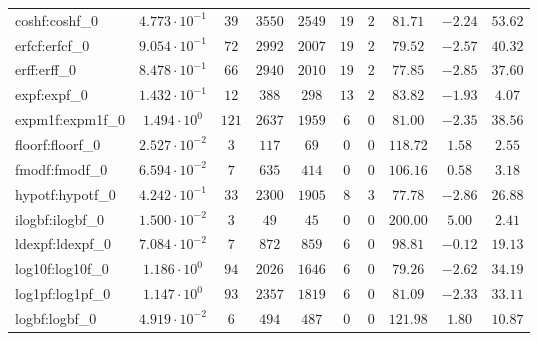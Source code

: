 \begin{tabular}{|l|c|c|c|c|c|c|c|c|c|}
coshf:coshf\_0               & $ 4.773 \cdot 10^{-1} $ & $ 39     $ & $ 3550  $ & $ 2549  $ & $ 19  $ & $ 2  $ & $ 81.71       $ & $ -2.24   $ & $ 53.62   $ \\
erfcf:erfcf\_0               & $ 9.054 \cdot 10^{-1} $ & $ 72     $ & $ 2992  $ & $ 2007  $ & $ 19  $ & $ 2  $ & $ 79.52       $ & $ -2.57   $ & $ 40.32   $ \\
erff:erff\_0                 & $ 8.478 \cdot 10^{-1} $ & $ 66     $ & $ 2940  $ & $ 2010  $ & $ 19  $ & $ 2  $ & $ 77.85       $ & $ -2.85   $ & $ 37.60   $ \\
expf:expf\_0                 & $ 1.432 \cdot 10^{-1} $ & $ 12     $ & $ 388   $ & $ 298   $ & $ 13  $ & $ 2  $ & $ 83.82       $ & $ -1.93   $ & $ 4.07    $ \\
expm1f:expm1f\_0             & $ 1.494 \cdot 10^{0}  $ & $ 121    $ & $ 2637  $ & $ 1959  $ & $ 6   $ & $ 0  $ & $ 81.00       $ & $ -2.35   $ & $ 38.56   $ \\
floorf:floorf\_0             & $ 2.527 \cdot 10^{-2} $ & $ 3      $ & $ 117   $ & $ 69    $ & $ 0   $ & $ 0  $ & $ 118.72      $ & $ 1.58    $ & $ 2.55    $ \\
fmodf:fmodf\_0               & $ 6.594 \cdot 10^{-2} $ & $ 7      $ & $ 635   $ & $ 414   $ & $ 0   $ & $ 0  $ & $ 106.16      $ & $ 0.58    $ & $ 3.18    $ \\
hypotf:hypotf\_0             & $ 4.242 \cdot 10^{-1} $ & $ 33     $ & $ 2300  $ & $ 1905  $ & $ 8   $ & $ 3  $ & $ 77.78       $ & $ -2.86   $ & $ 26.88   $ \\
ilogbf:ilogbf\_0             & $ 1.500 \cdot 10^{-2} $ & $ 3      $ & $ 49    $ & $ 45    $ & $ 0   $ & $ 0  $ & $ 200.00      $ & $ 5.00    $ & $ 2.41    $ \\
ldexpf:ldexpf\_0             & $ 7.084 \cdot 10^{-2} $ & $ 7      $ & $ 872   $ & $ 859   $ & $ 6   $ & $ 0  $ & $ 98.81       $ & $ -0.12   $ & $ 19.13   $ \\
log10f:log10f\_0             & $ 1.186 \cdot 10^{0}  $ & $ 94     $ & $ 2026  $ & $ 1646  $ & $ 6   $ & $ 0  $ & $ 79.26       $ & $ -2.62   $ & $ 34.19   $ \\
log1pf:log1pf\_0             & $ 1.147 \cdot 10^{0}  $ & $ 93     $ & $ 2357  $ & $ 1819  $ & $ 6   $ & $ 0  $ & $ 81.09       $ & $ -2.33   $ & $ 33.11   $ \\
logbf:logbf\_0               & $ 4.919 \cdot 10^{-2} $ & $ 6      $ & $ 494   $ & $ 487   $ & $ 0   $ & $ 0  $ & $ 121.98      $ & $ 1.80    $ & $ 10.87   $ \\

\end{tabular}
